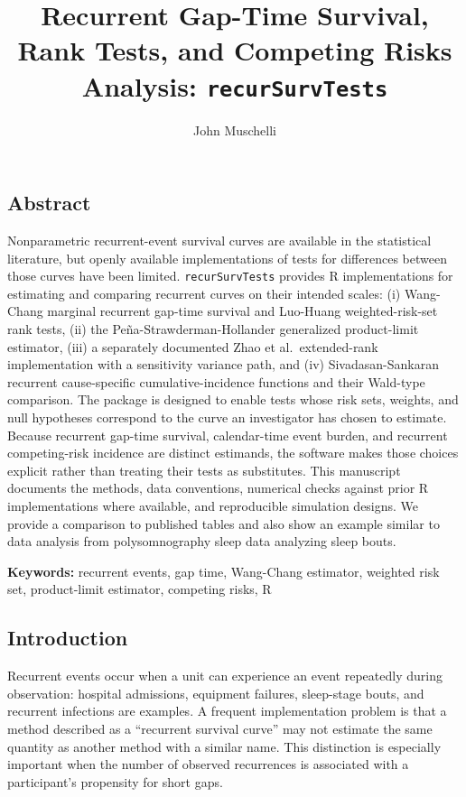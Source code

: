 \documentclass[
  12pt]{article}
\title{Recurrent Gap-Time Survival, Rank Tests, and Competing Risks
Analysis: \texttt{recurSurvTests}}
\author{John Muschelli}
\date{}
\begin{document}
\maketitle


\subsection{Abstract}\label{abstract}

Nonparametric recurrent-event survival curves are available in the
statistical literature, but openly available implementations of tests
for differences between those curves have been limited.
\texttt{recurSurvTests} provides R implementations for estimating and
comparing recurrent curves on their intended scales: (i) Wang-Chang
marginal recurrent gap-time survival and Luo-Huang weighted-risk-set
rank tests, (ii) the Peña-Strawderman-Hollander generalized
product-limit estimator, (iii) a separately documented Zhao et
al.~extended-rank implementation with a sensitivity variance path, and
(iv) Sivadasan-Sankaran recurrent cause-specific cumulative-incidence
functions and their Wald-type comparison. The package is designed to
enable tests whose risk sets, weights, and null hypotheses correspond to
the curve an investigator has chosen to estimate. Because recurrent
gap-time survival, calendar-time event burden, and recurrent
competing-risk incidence are distinct estimands, the software makes
those choices explicit rather than treating their tests as substitutes.
This manuscript documents the methods, data conventions, numerical
checks against prior R implementations where available, and reproducible
simulation designs. We provide a comparison to published tables and also
show an example similar to data analysis from polysomnography sleep data
analyzing sleep bouts.

\textbf{Keywords:} recurrent events, gap time, Wang-Chang estimator,
weighted risk set, product-limit estimator, competing risks, R

\subsection{Introduction}\label{introduction}

Recurrent events occur when a unit can experience an event repeatedly
during observation: hospital admissions, equipment failures, sleep-stage
bouts, and recurrent infections are examples. A frequent implementation
problem is that a method described as a ``recurrent survival curve'' may
not estimate the same quantity as another method with a similar name.
This distinction is especially important when the number of observed
recurrences is associated with a participant's propensity for short
gaps.
\end{document}
